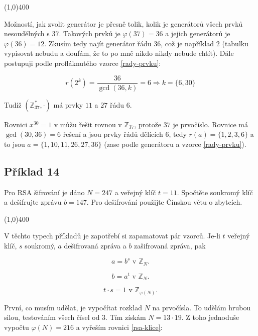 \documentclass{article}
\begin{document}
\line(1,0){400}

Možností, jak zvolit generátor je přesně tolik, kolik je generátorů všech prvků nesoudělných s $37$. Takových prvků je $\varphi(37) = 36$ a jejich generátorů je $\varphi(36) = 12$. Zkusím tedy najít generátor řádu $36$, což je například $2$ (tabulku vypisovat nebudu a doufám, že to po mně nikdo nikdy nebude chtít). Dále postupuji podle profláknutého vzorce \ref{rady-prvku}:

\[ r(2^k) = \frac{36}{\gcd(36,k)} = 6 \Rightarrow k = \{6,30\} \]

Tudíž $(\mathbb{Z}_{37}^*, \cdot)$ má prvky $11$ a $27$ řádu $6$.

Rovnici $x^{30} = 1$ v můžu řešit rovnou v $\mathbb{Z}_{37}$, protože $37$ je prvočíslo. Rovnice má $\gcd(30,36) = 6$ řešení a jsou prvky řádů dělících $6$, tedy $r(a) = \{1,2,3,6\}$ a to jsou $a = \{1,10,11,26,27,36\}$ (zase podle generátoru a vzorce \ref{rady-prvku}). 

\subsection{\label{priklad1-14}Příklad 14}
Pro RSA šifrování je dáno $N = 247$ a veřejný klíč $t = 11$. Spočtěte soukromý klíč a dešifrujte zprávu $b = 147$. Pro dešifrování použijte Čínskou větu o zbytcích.

\line(1,0){400}

V těchto typech příkladů je zapotřebí si zapamatovat pár vzorců. Je-li $t$ veřejný klíč, $s$ soukromý, $a$ dešifrovaná zpráva a $b$ zašifrovaná zpráva, pak

\begin{equation}
	 a = b^s \mbox{ v } \mathbb{Z}_N.
	 \label{rsa-odsifrovani}
\end{equation}
 
\begin{equation}
	 b = a^t \mbox{ v } \mathbb{Z}_N.
\end{equation}

\begin{equation}
	 t\cdot s = 1 \mbox{ v } \mathbb{Z}_{\varphi(N)}.
	\label{rsa-klice}
\end{equation}

První, co musím udělat, je vypočítat rozklad $N$ na prvočísla. To udělám hrubou silou, testováním všech čísel od $3$. Tím získám $N = 13\cdot19$. Z toho jednoduše vypočtu $\varphi(N) = 216$ a vyřeším rovnici \ref{rsa-klice}:
\end{document}
